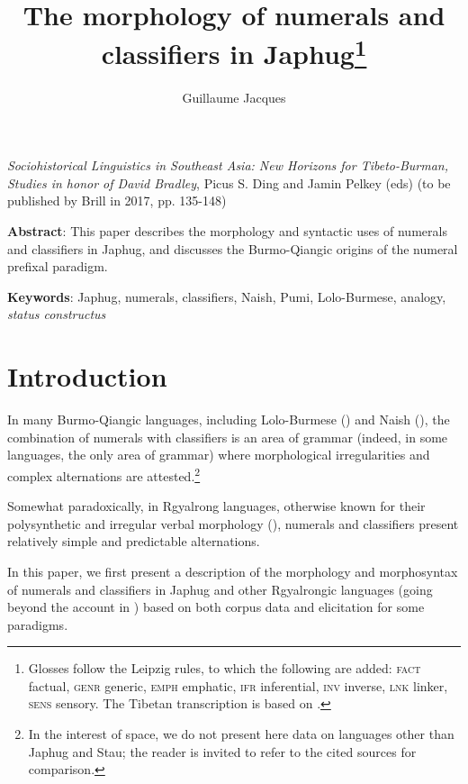 \documentclass[oldfontcommands,oneside,a4paper,12pt]{article}
\begin{document}
\title{The morphology of numerals and classifiers in Japhug\footnote{Glosses follow the Leipzig rules, to which the following are added:  \textsc{fact} factual, \textsc{genr} generic,   \textsc{emph} emphatic, \textsc{ifr} inferential, \textsc{inv} inverse, \textsc{lnk} linker, \textsc{sens} sensory. The Tibetan transcription is based on \citet{jacques12transcription}.} }
\author{Guillaume Jacques}
\maketitle

\sloppy
\textit{Sociohistorical Linguistics in Southeast Asia: New Horizons for Tibeto-Burman, Studies in honor of David Bradley}, Picus S. Ding and Jamin Pelkey (eds) (to be published by Brill in 2017, pp. 135-148)

\textbf{Abstract}: This paper describes the morphology and syntactic uses of numerals and classifiers in Japhug, and discusses the Burmo-Qiangic origins of the numeral prefixal paradigm.

\textbf{Keywords}: Japhug, numerals, classifiers, Naish, Pumi, Lolo-Burmese, analogy, \textit{status constructus}



\section{Introduction}
In many Burmo-Qiangic languages, including Lolo-Burmese (\citealt{bradley05numerals}) and Naish (\citealt{michaud11cl, michaud13numeral}), the combination of numerals with classifiers is an area of grammar (indeed, in some languages, the only area of grammar) where
morphological irregularities and complex alternations are attested.\footnote{In the interest of space, we do not present here data on languages other than Japhug and Stau; the reader is invited to refer to the cited sources for comparison.}

Somewhat paradoxically, in Rgyalrong languages, otherwise known for their polysynthetic and irregular verbal morphology (\citealt{jackson14morpho, jacques12incorp}), numerals and classifiers present relatively simple and predictable alternations. 

In this paper, we first present a  description of the morphology and morphosyntax of numerals and classifiers in Japhug and other Rgyalrongic  languages (going beyond the account in   \citealt{jacques08}) based on both corpus data and elicitation for some paradigms. 
\end{document}
